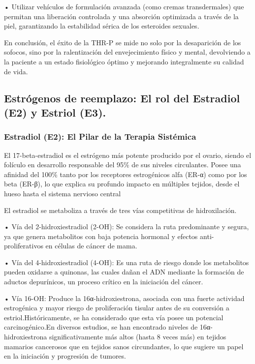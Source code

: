\documentclass[
  spanish,
]{article}
\begin{document}
• Utilizar vehículos de formulación avanzada (como cremas transdermales) que permitan una liberación controlada y una absorción optimizada a través de la piel, garantizando la estabilidad sérica de los esteroides sexuales.

En conclusión, el éxito de la THR-P se mide no solo por la desaparición de los sofocos, sino por la ralentización del envejecimiento físico y mental, devolviendo a la paciente a un estado fisiológico óptimo y mejorando integralmente su calidad de vida.

\subsection{Estrógenos de reemplazo: El rol del Estradiol (E2) y Estriol (E3).}\label{estruxf3genos-de-reemplazo-el-rol-del-estradiol-e2-y-estriol-e3.}

\subsubsection{Estradiol (E2): El Pilar de la Terapia Sistémica}\label{estradiol-e2-el-pilar-de-la-terapia-sistuxe9mica}

El 17-beta-estradiol es el estrógeno más potente producido por el ovario, siendo el folículo en desarrollo responsable del 95\% de sus niveles circulantes. Posee una afinidad del 100\% tanto por los receptores estrogénicos alfa (ER-α) como por los beta (ER-β), lo que explica su profundo impacto en múltiples tejidos, desde el hueso hasta el sistema nervioso central

El estradiol se metaboliza a través de tres vías competitivas de hidroxilación.

• Vía del 2-hidroxiestradiol (2-OH): Se considera la ruta predominante y segura, ya que genera metabolitos con baja potencia hormonal y efectos anti-proliferativos en células de cáncer de mama.

• Vía del 4-hidroxiestradiol (4-OH): Es una ruta de riesgo donde los metabolitos pueden oxidarse a quinonas, las cuales dañan el ADN mediante la formación de aductos depurínicos, un proceso crítico en la iniciación del cáncer.

• Vía 16-OH: Produce la 16α-hidroxiestrona, asociada con una fuerte actividad estrogénica y mayor riesgo de proliferación tisular antes de su conversión a estriol.Históricamente, se ha considerado que esta vía posee un potencial carcinogénico.En diversos estudios, se han encontrado niveles de 16α-hidroxiestrona significativamente más altos (hasta 8 veces más) en tejidos mamarios cancerosos que en tejidos sanos circundantes, lo que sugiere un papel en la iniciación y progresión de tumores.
\end{document}
